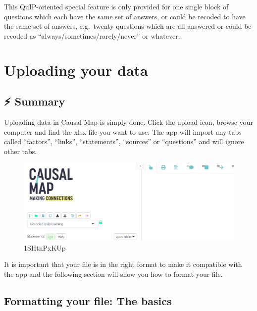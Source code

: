 \documentclass[
]{book}
\begin{document}
This QuIP-oriented special feature is only provided for one single block of questions which each have the same set of answers, or could be recoded to have the same set of answers, e.g.~twenty questions which are all answered or could be recoded as ``always/sometimes/rarely/never'' or whatever.

\hypertarget{ximport}{%
\chapter{Uploading your data}\label{ximport}}

\hypertarget{upload-summary}{%
\section{⚡ Summary}\label{upload-summary}}

Uploading data in Causal Map is simply done. Click the upload icon, browse your computer and find the xlsx file you want to use. The app will import any tabs called ``factors'', ``links'', ``statements'', ``sources'' or ``questions'' and will ignore other tabs.

\begin{figure}
\centering
\includegraphics[width=6.77083in,height=\textheight]{_assets/1SHtnPxKUp.gif}
\caption{1SHtnPxKUp}
\end{figure}

It is important that your file is in the right format to make it compatible with the app and the following section will show you how to format your file.

\hypertarget{formattingyourfile}{%
\section{Formatting your file: The basics}\label{formattingyourfile}}
\end{document}

